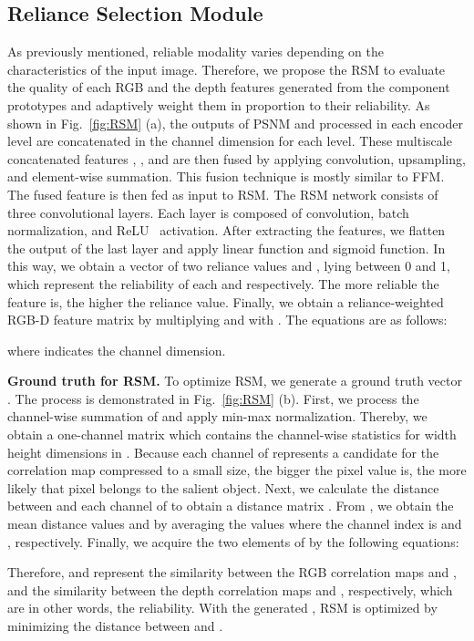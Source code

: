 \documentclass[runningheads]{llncs}
\begin{document}
	\subsection{Reliance Selection Module}
	\label{RSM}
	As previously mentioned, reliable modality varies depending on the characteristics of the input image. Therefore, we propose the RSM to evaluate the quality of each RGB and the depth features generated from the component prototypes and adaptively weight them in proportion to their reliability. As shown in Fig.~\ref{fig:RSM} (a), the outputs of PSNM  and  processed in each encoder level are concatenated in the channel dimension for each level. These multiscale concatenated features , , and  are then fused by applying  convolution, upsampling, and element-wise summation. This fusion technique is mostly similar to FFM. The fused feature  is then fed as input to RSM. The RSM network consists of three convolutional layers. Each layer is composed of convolution, batch normalization, and ReLU~\cite{agarap2018deep} activation. After extracting the features, we flatten the output of the last layer and apply linear function and sigmoid function. In this way, we obtain a vector  of two reliance values  and , lying between 0 and 1, which represent the reliability of each  and  respectively. The more reliable the feature is, the higher the reliance value. Finally, we obtain a reliance-weighted RGB-D feature matrix  by multiplying  and  with . The equations are as follows:
	
	
	
	\noindent where  indicates the channel dimension. 
	
	\noindent
	\textbf{Ground truth for RSM.} To optimize RSM, we generate a ground truth vector . The process is demonstrated in Fig.~\ref{fig:RSM} (b). First, we process the channel-wise summation of  and apply min-max normalization. Thereby, we obtain a one-channel matrix  which contains the channel-wise statistics for width  height dimensions in . Because each channel of  represents a candidate for the correlation map compressed to a small size, the bigger the pixel value is, the more likely that pixel belongs to the salient object. Next, we calculate the  distance between  and each channel of  to obtain a distance matrix . From , we obtain the mean distance values  and  by averaging the values where the channel index  is  and , respectively. Finally, we acquire the two elements of  by the following equations:
	
	
	Therefore,  and  represent the similarity between the RGB correlation maps and , and the similarity between the depth correlation maps and , respectively, which are in other words, the reliability. 
	With the generated , RSM is optimized by minimizing the  distance between  and .
	
\end{document}
